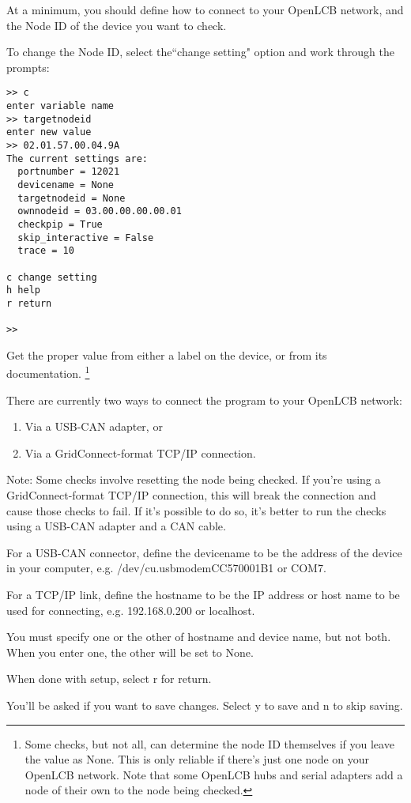 At a minimum, you should define how to connect to your OpenLCB network,
and the Node ID of the device you want to check.

To change the Node ID, select the``change setting" option and work through the prompts:

\begin{verbatim}
>> c
enter variable name
>> targetnodeid
enter new value
>> 02.01.57.00.04.9A
The current settings are:
  portnumber = 12021
  devicename = None
  targetnodeid = None
  ownnodeid = 03.00.00.00.00.01
  checkpip = True
  skip_interactive = False
  trace = 10

c change setting
h help
r return

>>
\end{verbatim}

Get the proper value from either a label on the device, or from its documentation.
\footnote{Some checks, but not all, can determine the node ID themselves if you leave
    the value as None. This is only reliable if there's just one node on your OpenLCB
    network.  Note that some OpenLCB hubs and serial adapters 
    add a node of their own to the node being checked.}

There are currently two ways to connect the program to your OpenLCB network:
\begin{enumerate}
\item Via a USB-CAN adapter, or
\item Via a GridConnect-format TCP/IP connection.
\end{enumerate}

Note:  Some checks involve resetting the node being checked.
If you're using a GridConnect-format TCP/IP connection, this will break the
connection and cause those checks to fail.  If it's possible to do so, it's
better to run the checks using a USB-CAN adapter and a CAN cable.

For a USB-CAN connector, define the devicename to be the address of the device in your computer,
e.g. /dev/cu.usbmodemCC570001B1 or COM7.

For a TCP/IP link, define the hostname to be the IP address or host name to be used
for connecting, e.g. 192.168.0.200 or localhost.

You must specify one or the other of hostname and device name, but not both.
When you enter one, the other will be set to None.

When done with setup, select r for return.

You'll be asked if you want to save changes.
Select y to save and n to skip saving.

